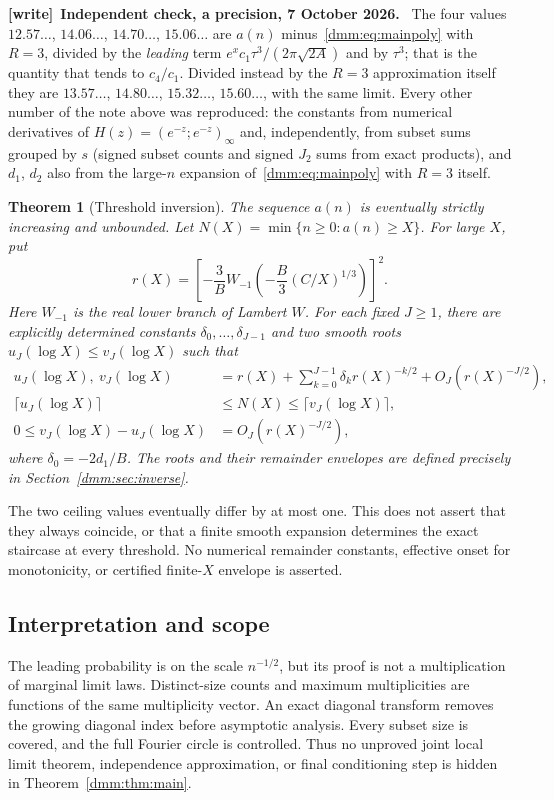 \documentclass[11pt,letterpaper]{article}
\numberwithin{equation}{section}
\newtheorem{theorem}{Theorem}[section]
\theoremstyle{definition}\newtheorem{definition}[theorem]{Definition}
\theoremstyle{remark}\newtheorem{remark}[theorem]{Remark}
\newenvironment{writenote}[1][]{\par\smallskip\begingroup\small
 \noindent\textbf{[write]}\if\relax\detokenize{#1}\relax\else~\textbf{#1.}\fi\ }%
 {\par\endgroup\smallskip}
\begin{document}
\begin{writenote}[Independent check, a precision, 7 October 2026]
The four values $12.57\ldots$, $14.06\ldots$, $14.70\ldots$, $15.06\ldots$
are $a(n)$ minus~\eqref{dmm:eq:mainpoly} with $R=3$, divided by the
\emph{leading} term $e^xc_1\tau^3/(2\pi\sqrt{2A})$ and by $\tau^3$; that is
the quantity that tends to $c_4/c_1$. Divided instead by the $R=3$
approximation itself they are $13.57\ldots$, $14.80\ldots$, $15.32\ldots$,
$15.60\ldots$, with the same limit. Every other number of the note above was
reproduced: the constants from numerical derivatives of
$H(z)=(e^{-z};e^{-z})_\infty$ and, independently, from subset sums grouped by
$s$ (signed subset counts and signed $J_2$ sums from exact products), and
$d_1$, $d_2$ also from the large-$n$ expansion of~\eqref{dmm:eq:mainpoly}
with $R=3$ itself.
\end{writenote}

\begin{theorem}[Threshold inversion]\label{dmm:thm:inverseintro}
The sequence $a(n)$ is eventually strictly increasing and unbounded. Let
$N(X)=\min\{n\ge0:a(n)\ge X\}$. For large $X$, put
\begin{equation}\label{dmm:eq:lambertintro}
r(X)=\left[-\frac3B W_{-1}\!\left(-\frac B3(C/X)^{1/3}\right)\right]^2.
\end{equation}
Here $W_{-1}$ is the real lower branch of Lambert $W$. For each fixed $J\ge1$, there are explicitly determined constants $\delta_0,\ldots,\delta_{J-1}$ and two smooth roots $u_J(\log X)\le v_J(\log X)$ such that
\begin{align}\label{dmm:eq:inverseintro}
u_J(\log X),\ v_J(\log X)
&=r(X)+\sum_{k=0}^{J-1}\delta_k r(X)^{-k/2}
+O_J(r(X)^{-J/2}),\\
\lceil u_J(\log X)\rceil&\le N(X)\le\lceil v_J(\log X)\rceil,\nonumber\\
0\le v_J(\log X)-u_J(\log X)&=O_J(r(X)^{-J/2}),\nonumber
\end{align}
where $\delta_0=-2d_1/B$. The roots and their remainder envelopes are defined precisely in Section~\ref{dmm:sec:inverse}.
\end{theorem}
The two ceiling values eventually differ by at most one. This does not assert that they always coincide, or that a finite smooth expansion determines the exact staircase at every threshold. No numerical remainder constants, effective onset for monotonicity, or certified finite-$X$ envelope is asserted.

\subsection{Interpretation and scope}
The leading probability is on the scale $n^{-1/2}$, but its proof is not a multiplication of marginal limit laws. Distinct-size counts and maximum multiplicities are functions of the same multiplicity vector. An exact diagonal transform removes the growing diagonal index before asymptotic analysis. Every subset size is covered, and the full Fourier circle is controlled. Thus no unproved joint local limit theorem, independence approximation, or final conditioning step is hidden in Theorem~\ref{dmm:thm:main}.
\end{document}
